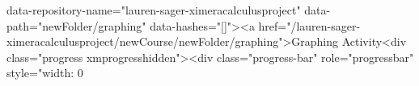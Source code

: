 data-repository-name="lauren-sager-ximeracalculusproject" data-path="newFolder/graphing" data-hashes="[]"><a href="/lauren-sager-ximeracalculusproject/newCourse/newFolder/graphing">Graphing Activity<div class="progress xmprogresshidden"><div class="progress-bar" role="progressbar" style="width: 0%